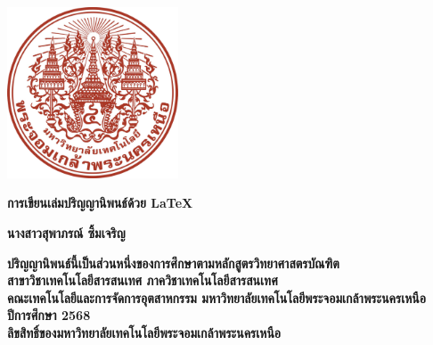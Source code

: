\newpage
\thispagestyle{empty}
\begin{center}

\includegraphics[width=5.08cm]{Image/Logo_KMUTNB_Thai.png}
\vspace{2mm}

{\bf
    การเขียนเล่มปริญญานิพนธ์ด้วย LaTeX     %
}

\vspace{60mm}
{\bf
    นางสาวสุพาภรณ์ ซิ้มเจริญ %
}
\vspace{64mm}   






{\bf 
    ปริญญานิพนธ์นี้เป็นส่วนหนึ่งของการศึกษาตามหลักสูตรวิทยาศาสตรบัณฑิต\\
    สาขาวิชาเทคโนโลยีสารสนเทศ ภาควิชาเทคโนโลยีสารสนเทศ\\
    
    
    
    คณะเทคโนโลยีและการจัดการอุตสาหกรรม มหาวิทยาลัยเทคโนโลยีพระจอมเกล้าพระนครเหนือ    \\
    ปีการศึกษา 2568\\
    ลิขสิทธิ์ของมหาวิทยาลัยเทคโนโลยีพระจอมเกล้าพระนครเหนือ
}

\end{center}

